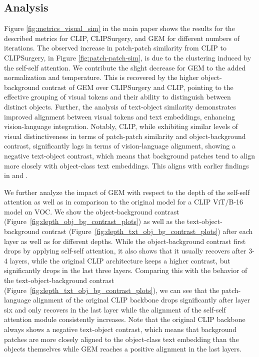 \documentclass[10pt,twocolumn,letterpaper]{article}
\begin{document}
\subsection{Analysis}
Figure \ref{fig:metrics_visual_sim} in the main paper shows the results for the described metrics for CLIP, CLIPSurgery, and GEM for different numbers of iterations.
The observed increase in patch-patch similarity from CLIP to CLIPSurgery, in Figure \ref{fig:patch-patch-sim}, is due to the clustering induced by the self-self attention. 
We contribute the slight decrease for GEM to the added normalization and temperature. 
This is recovered by the higher object-background contrast of GEM over CLIPSurgery and CLIP, pointing to the effective grouping of visual tokens and their ability to distinguish between distinct objects.
Further, the analysis of text-object similarity demonstrates improved alignment between visual tokens and text embeddings, enhancing vision-language integration. 
Notably, CLIP, while exhibiting similar levels of visual distinctiveness in terms of patch-patch similarity and object-background contrast, significantly lags in terms of vision-language alignment, showing a negative text-object contrast, which means that background patches tend to align more closely with object-class text embeddings. This aligns with earlier findings in \citet{li2023clipsurgery} and \citet{mukhoti2023open}. 

We further analyze the impact of GEM with respect to the depth of the self-self attention as well as in comparison to the original model for a CLIP ViT/B-16 model on VOC. 
We show the object-background contrast (Figure~\ref{fig:depth_obj_bg_contrast_plots}) as well as the text-object-background contrast (Figure~\ref{fig:depth_txt_obj_bg_contrast_plots}) after each layer as well as for different depths. 
While the object-background contrast first drops by applying self-self attention, it also shows that it usually recovers after 3-4 layers, while the original CLIP architecture keeps a higher contrast, but significantly drops in the last three layers. 
Comparing this with the behavior of the text-object-background contrast (Figure~\ref{fig:depth_txt_obj_bg_contrast_plots}), we can see that the patch-language alignment of the original CLIP backbone drops significantly after layer six and only recovers in the last layer while the alignment of the self-self attention module consistently increases. Note that the original CLIP backbone always shows a negative text-object contrast, which means that background patches are more closely aligned to the object-class text embedding than the objects themselves while GEM reaches a positive alignment in the last layers.  
  
\end{document}
